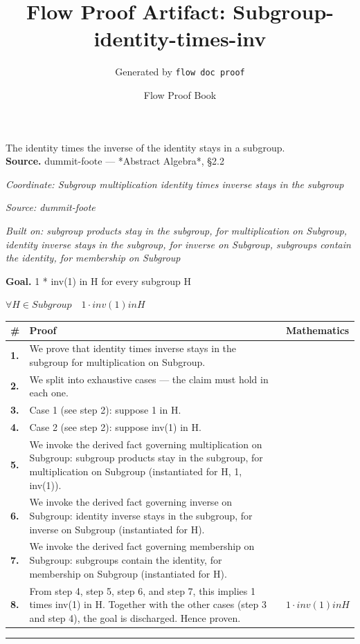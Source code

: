 \documentclass[11pt]{article}
\title{Flow Proof Artifact: Subgroup-identity-times-inv}
\author{Generated by \texttt{flow doc proof}}
\date{Flow Proof Book}
\theoremstyle{definition}
\begin{document}
\maketitle
The identity times the inverse of the identity stays in a subgroup.\\[0.5em]
\textbf{Source.} dummit-foote — *Abstract Algebra*, §2.2\\[0.5em]
\bigskip
{}\par
\smallskip\noindent\textit{Coordinate: Subgroup \cdot multiplication \cdot identity times inverse stays in the subgroup}\par
\smallskip\noindent\textit{Source: dummit-foote}\par
\smallskip\noindent\textit{Built on: subgroup products stay in the subgroup, for multiplication on Subgroup, identity inverse stays in the subgroup, for inverse on Subgroup, subgroups contain the identity, for membership on Subgroup}\par
\medskip
\noindent\textbf{Goal.} 1 * inv(1) in H for every subgroup H\par
\noindent$\displaystyle \forall H \in Subgroup\quad 1 \cdot inv(1) in H$\par
\medskip
\noindent
\begin{tabular}{@{} >{\raggedright\arraybackslash}p{} >{\raggedright\arraybackslash}p{} >{\raggedleft\arraybackslash}p{} @{}}
\textbf{\#} & \textbf{Proof} & \textbf{Mathematics} \\
\midrule
\textbf{1.} & We prove that identity times inverse stays in the subgroup for multiplication on Subgroup. & \\[0.45em]
\textbf{2.} & We split into exhaustive cases — the claim must hold in each one. & \\[0.45em]
\textbf{3.} & Case 1 (see step 2): suppose 1 in H. & \\[0.45em]
\textbf{4.} & Case 2 (see step 2): suppose inv(1) in H. & \\[0.45em]
\textbf{5.} & We invoke the derived fact governing multiplication on Subgroup: subgroup products stay in the subgroup, for multiplication on Subgroup (instantiated for H, 1, inv(1)). & \\[0.45em]
\textbf{6.} & We invoke the derived fact governing inverse on Subgroup: identity inverse stays in the subgroup, for inverse on Subgroup (instantiated for H). & \\[0.45em]
\textbf{7.} & We invoke the derived fact governing membership on Subgroup: subgroups contain the identity, for membership on Subgroup (instantiated for H). & \\[0.45em]
\textbf{8.} & From step 4, step 5, step 6, and step 7, this implies 1 times inv(1) in H. Together with the other cases (step 3 and step 4), the goal is discharged. Hence proven. & $\displaystyle 1 \cdot inv(1) in H$ \\[0.45em]
\bottomrule
\end{tabular}
\label{thm:Subgroup-multiplication-identity_times_inverse_stays_in_the_subgroup}
\par\medskip\hrule
\end{document}
